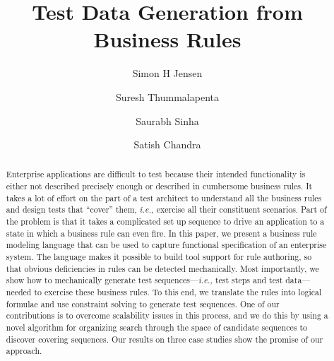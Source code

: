 \documentclass{sig-alternate}
\begin{document}
\newcommand{\ie}{\textit{i.e.,} }
\newcommand{\eg}{\textit{e.g.,} }
\newcommand{\subject}[1]{\texttt{\small #1}}
\newcommand{\rules}{{\mathcal R}}
\newcommand{\tests}{{\mathcal T}}
\newcommand{\elemexists}{\mt{exists}}
\newcommand{\elemenabled}{\mt{enabled}}
\newcommand{\elemexplored}{\mt{explored}}
\newcommand{\note}[1]{{\color{red}$[$ \bf #1 $]$}}
\newcommand{\lang}[1]{\texttt{\scriptsize #1}}
\newcommand{\tool}{\textsc{buster}}
\newcommand{\exhaust}{\textsc{exhaust}}
\newcommand{\choco}{\textsc{choco}}
\newcommand{\wateg}{\textsc{wateg}}

\title{Test Data Generation from Business Rules}

\author{Simon H Jensen \and Suresh Thummalapenta \and Saurabh Sinha \and Satish Chandra}

\maketitle

\begin{abstract}
Enterprise applications are difficult to test because their intended
functionality is either not described precisely enough or described in
cumbersome business rules. It takes a lot of effort on the part of a test
architect to understand all the business rules and design tests that ``cover''
them, \ie exercise all their constituent scenarios. Part of the problem is that
it takes a complicated set up sequence to drive an application to a state in
which a business rule can even fire.  In this paper, we present a business rule
modeling language that can be used to capture functional specification of an
enterprise system. The language makes it possible to build tool support for rule
authoring, so that obvious deficiencies in rules can be detected
mechanically. Most importantly, we show how to mechanically generate test
sequences---\ie test steps and test data---needed to exercise these business
rules. To this end, we translate the rules into logical formulae and use
constraint solving to generate test sequences.  One of our contributions is to
overcome scalability issues in this process, and we do this by using a novel
algorithm for organizing search through the space of candidate sequences to
discover covering sequences.  Our results on three case studies show the promise
of our approach.
\end{abstract}










\end{document}
